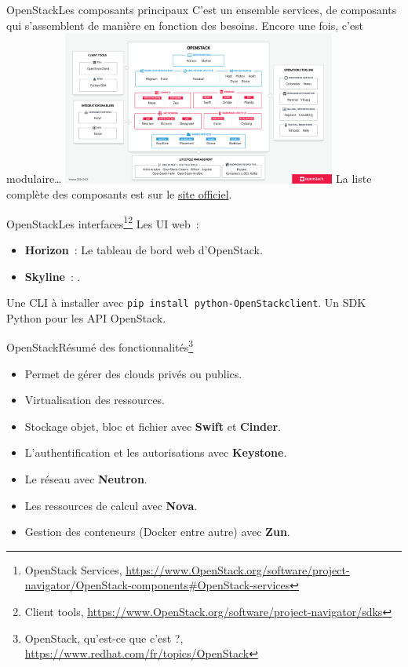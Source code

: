 \documentclass{beamer}
\begin{document}
    \begin{frame}{OpenStack}{Les composants principaux}
        C'est un ensemble services, de composants qui s'assemblent de manière  en fonction des besoins.
        Encore une fois, c'est modulaire\ldots
        \bigbreak
        \centering
        \includegraphics[width=9cm]{image/openstack-components}
        \bigbreak
        \flushleft
        La liste complète des composants est sur le \href{https://www.OpenStack.org/software/project-navigator/OpenStack-components\#OpenStack-services}{site officiel}.
    \end{frame}

    \begin{frame}{OpenStack}{Les interfaces\footnote{\label{OpenStackservices}OpenStack Services, \url{https://www.OpenStack.org/software/project-navigator/OpenStack-components\#OpenStack-services}}\footnote{Client tools, \url{https://www.OpenStack.org/software/project-navigator/sdks}}}
        Les UI web~:
        \begin{itemize}
            \item \textbf{Horizon}~: Le tableau de bord web d'OpenStack.
            \item \textbf{Skyline}~: .
        \end{itemize}
        \bigbreak
        Une CLI à installer avec \lstinline{pip install python-OpenStackclient}.
        \bigbreak
        Un SDK Python pour les API OpenStack.
    \end{frame}

    \begin{frame}{OpenStack}{Résumé des fonctionnalités\footnote{\label{redhatopentack}OpenStack, qu'est-ce que c'est ?, \url{https://www.redhat.com/fr/topics/OpenStack}}}
        \begin{itemize}
            \item Permet de gérer des clouds privés ou publics.
            \item Virtualisation des ressources.
            \item Stockage objet, bloc et fichier avec \textbf{Swift} et \textbf{Cinder}.
            \item L'authentification et les autorisations avec \textbf{Keystone}.
            \item Le réseau avec \textbf{Neutron}.
            \item Les ressources de calcul avec \textbf{Nova}.
            \item Gestion des conteneurs (Docker entre autre) avec \textbf{Zun}.
        \end{itemize}
    \end{frame}
\end{document}
